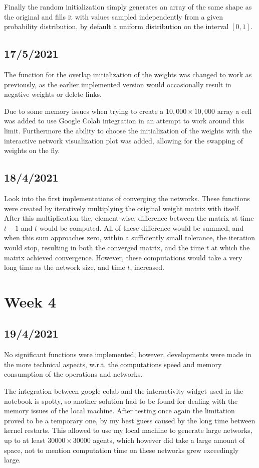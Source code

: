 \documentclass{article}
\begin{document}
Finally the random initialization simply generates an array of the same shape as the original and fills it with values sampled independently from a given probability distribution, by default a uniform distribution on the interval $[0, 1]$.

\subsection{17/5/2021}
The function for the overlap initialization of the weights was changed to work as previously, as the earlier implemented version would occasionally result in negative weights or delete links.

Due to some memory issues when trying to create a $10,000 \times 10,000$ array a cell was added to use Google Colab integration in an attempt to work around this limit. Furthermore the ability to choose the initialization of the weights with the interactive network visualization plot was added, allowing for the swapping of weights on the fly.

\subsection{18/4/2021}
Look into the first implementations of converging the networks. These functions were created by iteratively multiplying the original weight matrix with itself. After this multiplication the, element-wise, difference between the matrix at time $t-1$ and $t$ would be computed. All of these difference would be summed, and when this sum approaches zero, within a sufficiently small tolerance, the iteration would stop, resulting in both the converged matrix, and the time $t$ at which the matrix achieved convergence. However, these computations would take a very long time as the network size, and time $t$, increased.

\newpage

\section{Week 4}
\subsection{19/4/2021}
No significant functions were implemented, however, developments were made in the more technical aspects, w.r.t. the computations speed and memory consumption of the operations and networks.

The integration between google colab and the interactivity widget used in the notebook is spotty, so another solution had to be found for dealing with the memory issues of the local machine. After testing once again the limitation proved to be a temporary one, by my best guess caused by the long time between kernel restarts. This allowed to use my local machine to generate large networks, up to at least $30000 \times 30000$ agents, which however did take a large amount of space, not to mention computation time on these networks grew exceedingly large.
\end{document}
